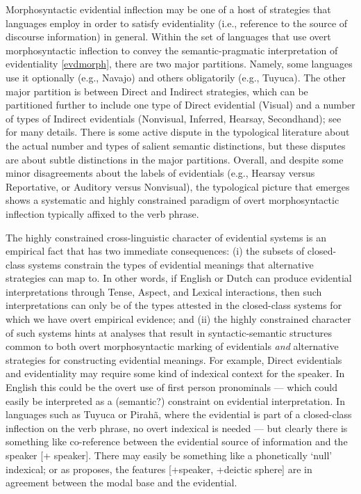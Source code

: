 \documentclass{article}
\begin{document}
Morphosyntactic evidential inflection may be one of a host of strategies that languages employ in order to satisfy evidentiality (i.e., reference to the source of discourse information) in general. Within the set of languages that use overt morphosyntactic inflection to convey the semantic-pragmatic interpretation of evidentiality \ref{evdmorph}, there are two major partitions. Namely, some languages use it optionally (e.g., Navajo) and others obligatorily (e.g., Tuyuca). The other major partition is between Direct and Indirect strategies, which can be partitioned further to include one type of Direct evidential ({\sc Visual}) and a number of types of Indirect evidentials ({\sc Nonvisual, Inferred, Hearsay, Secondhand}); see \cite{aikhenvald04evd} for many details. There is some active dispute in the typological literature about the actual number and types of salient semantic distinctions, but these disputes are about subtle distinctions in the major partitions. Overall, and despite some minor disagreements about the labels of evidentials (e.g., {\sc Hearsay} versus {\sc Reportative}, or {\sc Auditory} versus {\sc Nonvisual}), the typological picture that emerges shows a systematic and highly constrained paradigm of overt morphosyntactic inflection typically affixed to the verb phrase. 

The highly constrained cross-linguistic character of evidential systems is an empirical fact that has two immediate consequences: (i) the subsets of closed-class systems constrain the types of evidential meanings that alternative strategies can map to. In other words, if English or Dutch can produce evidential interpretations through Tense, Aspect, and Lexical interactions, then such interpretations can only be of the types attested in the closed-class systems for which we have overt empirical evidence; and (ii) the highly constrained character of such systems hints at analyses that result in syntactic-semantic structures common to both overt morphosyntactic marking of evidentials {\sl and} alternative strategies for constructing evidential meanings. For example, Direct evidentials and evidentiality may require some kind of indexical context for the speaker. In English this could be the overt use of first person pronominals --- which could easily be interpreted as a (semantic?) constraint on evidential interpretation. In languages such as Tuyuca or Pirah\~a, where the evidential is part of a closed-class inflection on the verb phrase, no overt indexical is needed --- but clearly there is something like co-reference between the evidential source of information and the speaker [+ speaker]. There may easily be something like a phonetically `null' indexical; or as \cite{speas04evdparadigms,speas08synsemevd} proposes, the features [+speaker, +deictic sphere] are in agreement between the modal base and the evidential.
\end{document}
